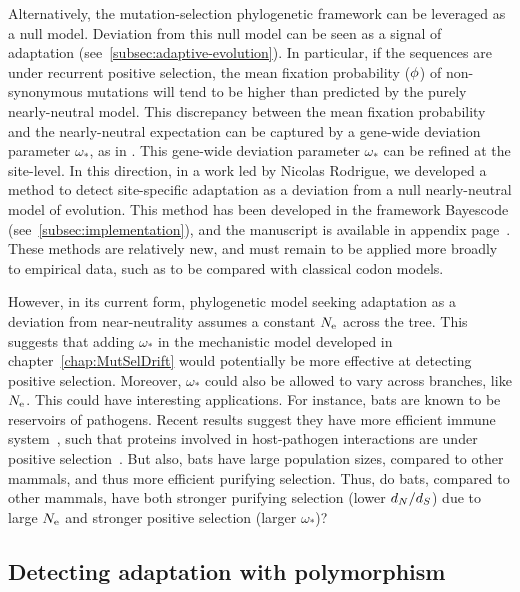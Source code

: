 Alternatively, the mutation-selection phylogenetic framework can be leveraged as a null model.
Deviation from this null model can be seen as a signal of adaptation (see~\ref{subsec:adaptive-evolution}).
In particular, if the sequences are under recurrent positive selection, the mean fixation probability ($\phi$) of non-synonymous mutations will tend to be higher than predicted by the purely nearly-neutral model.
This discrepancy between the mean fixation probability and the nearly-neutral expectation can be captured by a gene-wide deviation parameter $\omega_*$, as in \citet{Rodrigue2016}.
This gene-wide deviation parameter $\omega_*$ can be refined at the site-level.
In this direction, in a work led by Nicolas Rodrigue, we developed a method to detect site-specific adaptation as a deviation from a null nearly-neutral model of evolution.
This method has been developed in the framework Bayescode (see~\ref{subsec:implementation}), and the manuscript is available in appendix page~\pageref{sec-appendix:MutSelM3starMBE}.
These methods are relatively new, and must remain to be applied more broadly to empirical data, such as to be compared with classical codon models.

However, in its current form, phylogenetic model seeking adaptation as a deviation from near-neutrality assumes a constant $N_{\textrm{e}}$ across the tree.
This suggests that adding $\omega_*$ in the mechanistic model developed in chapter~\ref{chap:MutSelDrift} would potentially be more effective at detecting positive selection.
Moreover, $\omega_*$ could also be allowed to vary across branches, like $N_{\textrm{e}}$.
This could have interesting applications.
For instance, bats are known to be reservoirs of pathogens.
Recent results suggest they have more efficient immune system~\citep{Baker2013,Pavlovich2018}, such that proteins involved in host-pathogen interactions are under positive selection~\citep{Hawkins2019,Vandewege2020}.
But also, bats have large population sizes, compared to other mammals, and thus more efficient purifying selection.
Thus, do bats, compared to other mammals, have both stronger purifying selection (lower $d_N / d_S$) due to large $N_{\textrm{e}}$ and stronger positive selection (larger $\omega_*$)?

\subsection{Detecting adaptation with polymorphism}
\label{subsec:detecting-adaptation-with-polymorphism}

